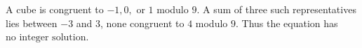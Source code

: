 A cube is congruent to $-1,0,$ or $1$ modulo $9$. A sum of three such representatives lies between $-3$ and $3$, none congruent to $4$ modulo $9$. Thus the equation has $\boxed{\text{no integer solution}}$.
